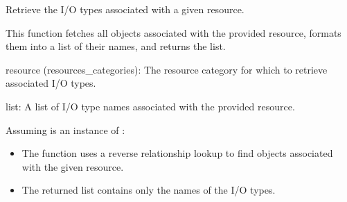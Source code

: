 \documentclass[letterpaper,10pt,english]{sphinxmanual}
\begin{document}
\begin{fulllineitems}
\label{\detokenize{app:app.views.get_io_res}}
\pysigstartsignatures
{}
\pysigstopsignatures
\sphinxAtStartPar
Retrieve the I/O types associated with a given resource.

\sphinxAtStartPar
This function fetches all  objects associated with the provided 
resource, formats them into a list of their names, and returns the list.
\begin{description}
\sphinxAtStartPar
resource (resources\_categories): The resource category for which to retrieve associated I/O types.

\sphinxAtStartPar
list: A list of I/O type names associated with the provided resource.

\sphinxAtStartPar
Assuming  is an instance of :

\begin{sphinxVerbatim}[commandchars=\\\{\}]
  
  
  
\end{sphinxVerbatim}

\begin{itemize}
\item {} 
\sphinxAtStartPar
The function uses a reverse relationship lookup to find  objects associated with the given resource.

\item {} 
\sphinxAtStartPar
The returned list contains only the names of the I/O types.

\end{itemize}

\end{description}

\end{fulllineitems}
\end{document}
